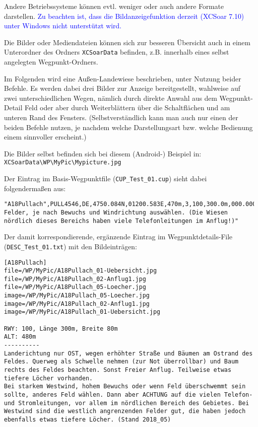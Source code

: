Andere Betriebssysteme können evtl. weniger oder auch andere Formate darstellen.
\textcolor{blue}{Zu beachten ist, dass die Bildanzeigefunktion derzeit (XCSoar 7.10) unter Windows nicht unterstützt wird.} 

Die Bilder oder Mediendateien können sich zur besseren Übersicht auch in einem Unterordner des Ordners \verb|XCSoarData| befinden, z.B. innerhalb eines selbst angelegten Wegpunkt-Ordners.



Im Folgenden wird eine Außen-Landewiese beschrieben, unter Nutzung beider Befehle. Es werden dabei drei Bilder zur Anzeige bereitgestellt, wahlweise auf zwei unterschiedlichen Wegen, nämlich durch direkte Anwahl aus dem Wegpunkt-Detail Feld oder aber durch Weiterblättern über die Schaltflächen \button{$<$} und \button{$>$} am unteren Rand des Fensters. (Selbstverständlich kann man auch nur einen der beiden Befehle nutzen, je nachdem welche Darstellungsart bzw. welche Bedienung einem sinnvoller erscheint.)

Die Bilder selbst befinden sich bei diesem (Android-) Beispiel in: \verb|XCSoarData\WP\MyPic\Mypicture.jpg| 

Der Eintrag im Basis-Wegpunktfile (\verb|CUP_Test_01.cup|) sieht dabei folgendermaßen aus:

\begin{verbatim}
"A18Pullach",PULL4546,DE,4750.084N,01200.583E,470m,3,100,300.0m,000.000,"Mehrere Felder, je nach Bewuchs und Windrichtung auswählen. (Die Wiesen nördlich dieses Bereichs haben viele Telefonleitungen im Anflug!)"
\end{verbatim}

Der damit korrespondierende, ergänzende Eintrag im Wegpunktdetails-File (\verb|DESC_Test_01.txt|) mit den Bildeinträgen:

\begin{verbatim}
[A18Pullach]
file=/WP/MyPic/A18Pullach_01-Uebersicht.jpg
file=/WP/MyPic/A18Pullach_02-Anflug1.jpg
file=/WP/MyPic/A18Pullach_05-Loecher.jpg
image=/WP/MyPic/A18Pullach_05-Loecher.jpg
image=/WP/MyPic/A18Pullach_02-Anflug1.jpg
image=/WP/MyPic/A18Pullach_01-Uebersicht.jpg

RWY: 100, Länge 300m, Breite 80m
ALT: 480m
----------
Landerichtung nur OST, wegen erhöhter Straße und Bäumen am Ostrand des Feldes. Querweg als Schwelle nehmen (zur Not überrollbar) und Baum rechts des Feldes beachten. Sonst Freier Anflug. Teilweise etwas tiefere Löcher vorhanden.
Bei starkem Westwind, hohem Bewuchs oder wenn Feld überschwemmt sein sollte, anderes Feld wählen. Dann aber ACHTUNG auf die vielen Telefon- und Stromleitungen, vor allem im nördlichen Bereich des Gebietes. Bei Westwind sind die westlich angrenzenden Felder gut, die haben jedoch ebenfalls etwas tiefere Löcher. (Stand 2018_05) 
\end{verbatim}

